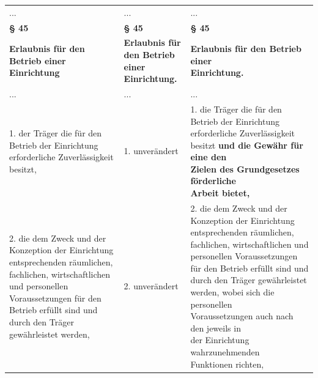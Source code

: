 \documentclass[10pt,a4paper,landscape]{article}
\begin{document}
\begin{longtable}{|L{8.2cm}|L{8.2cm}|L{8.2cm}|}
\hhline{|---|}
... & ... & ... \\
\hhline{|---|}
\textbf{\S{} 45} & \textbf{\S{} 45} & \textbf{\S{} 45} \\
\hhline{|---|}
\textbf{Erlaubnis für den Betrieb einer  \newline \textcolor{diffred}{Einrichtung}} & \textbf{Erlaubnis für den Betrieb einer  \newline Einrichtung.} & \textbf{Erlaubnis für den Betrieb einer  \newline Einrichtung.} \\
\hhline{|---|}
... & ... & ... \\
\hhline{|---|}
1.  \newline \textcolor{diffred}{der} Träger die für den Betrieb der  \newline Einrichtung erforderliche Zuverlässigkeit  \newline \textcolor{diffred}{besitzt,} & 1. unverändert & 1.   \newline \textcolor{diffgreen}{die} Träger die für den Betrieb der  \newline Einrichtung erforderliche Zuverlässigkeit  \newline \textcolor{diffgreen}{besitzt }\textbf{\textcolor{diffgreen}{und die Gewähr für eine den  \newline Zielen des Grundgesetzes förderliche  \newline Arbeit bietet,}} \\
\hhline{|---|}
2.  \newline die dem Zweck und der Konzeption der  \newline Einrichtung entsprechenden räumlichen,  \newline fachlichen, wirtschaftlichen und personellen  \newline Voraussetzungen für den Betrieb erfüllt  \newline sind und durch den Träger gewährleistet  \newline werden, & 2. unverändert & 2.   \newline die dem Zweck und der Konzeption der  \newline Einrichtung entsprechenden räumlichen,  \newline fachlichen, wirtschaftlichen und personellen  \newline Voraussetzungen für den Betrieb erfüllt  \newline sind und durch den Träger gewährleistet  \newline werden, \textcolor{diffgreen}{wobei sich die personellen  \newline Voraussetzungen auch nach den jeweils in  \newline der Einrichtung wahrzunehmenden  \newline Funktionen richten,} \\

\end{longtable}
\end{document}
